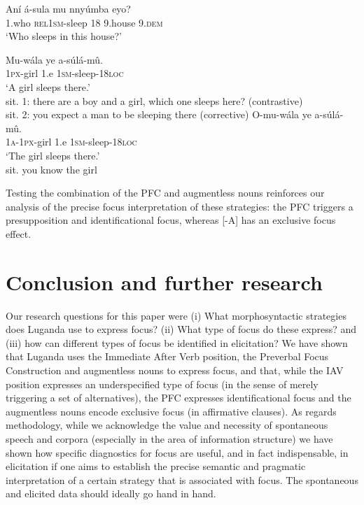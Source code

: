 \documentclass[output=paper]{langsci/langscibook}
\begin{document}
\ea\label{ex:vanderwal:42}
\ea\label{ex:vanderwal:42a}
\gll   Aní  á-sula      mu  nnyúmba  eyo?\\
       1.who  \textsc{rel1sm}-sleep  18  9.house  9.\textsc{dem}\\
\glt   ‘Who sleeps in this house?’


\ex\label{ex:vanderwal:42b}
\gll     Mu-wála  ye  a-súlá-mû.\\
         \textsc{1px}-girl  1.e  \textsc{1sm}-sleep-\textsc{18loc}\\
\glt ‘A girl sleeps there.’\\
sit. 1: there are a boy and a girl, which one sleeps here? (contrastive)\\
sit. 2: you expect a man to be sleeping there (corrective)
\ex\label{ex:vanderwal:42c}
\gll    O-mu-wála  ye  a-súlá-mû.\\
         \textsc{1a}-\textsc{1px}-girl  1.e  \textsc{1sm}-sleep-\textsc{18loc}\\
\glt ‘The girl sleeps there.’\\
sit. you know the girl
\z
\z

Testing the combination of the PFC and augmentless nouns reinforces our analysis of the precise focus interpretation of these strategies: the PFC triggers a presupposition and identificational focus, whereas [-A] has an exclusive focus effect.

\section{Conclusion and further research}\label{sec:vanderwal:6}

Our research questions for this paper were 
(i) What morphosyntactic strategies does Luganda use to express focus? 
(ii) What type of focus do these express? 
and (iii) how can different types of focus be identified in elicitation? We have shown that Luganda uses the Immediate After Verb position, the Preverbal Focus Construction and augmentless nouns to express focus, and that, while the IAV position expresses an underspecified type of focus (in the sense of merely triggering a set of alternatives), the PFC expresses identificational focus and the augmentless nouns encode exclusive focus (in affirmative clauses). As regards methodology, while we acknowledge the value and necessity of spontaneous speech and corpora (especially in the area of information structure) we have shown how specific diagnostics for focus are useful, and in fact indispensable, in elicitation if one aims to establish the precise semantic and pragmatic interpretation of a certain strategy that is associated with focus. The spontaneous and elicited data should ideally go hand in hand.
\end{document}
